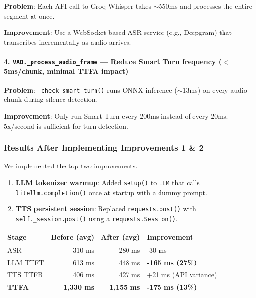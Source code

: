 \textbf{Problem}: Each API call to Groq Whisper takes $\sim$550ms and processes the entire segment at once.

\textbf{Improvement}: Use a WebSocket-based ASR service (e.g., Deepgram) that transcribes incrementally as audio arrives.

\paragraph{4. \texttt{VAD.\_process\_audio\_frame} --- Reduce Smart Turn frequency ($<$5ms/chunk, minimal TTFA impact)}

\textbf{Problem}: \texttt{\_check\_smart\_turn()} runs ONNX inference ($\sim$13ms) on every audio chunk during silence detection.

\textbf{Improvement}: Only run Smart Turn every 200ms instead of every 20ms. 5x/second is sufficient for turn detection.

\subsubsection{Results After Implementing Improvements 1 \& 2}

We implemented the top two improvements:

\begin{enumerate}
    \item \textbf{LLM tokenizer warmup}: Added \texttt{setup()} to \texttt{LLM} that calls \texttt{litellm.completion()} once at startup with a dummy prompt.
    \item \textbf{TTS persistent session}: Replaced \texttt{requests.post()} with \texttt{self.\_session.post()} using a \texttt{requests.Session()}.
\end{enumerate}

\begin{table}[h]
\centering
\begin{tabular}{|l|r|r|l|}
\hline
\textbf{Stage} & \textbf{Before (avg)} & \textbf{After (avg)} & \textbf{Improvement} \\
\hline
ASR & 310 ms & 280 ms & -30 ms \\
LLM TTFT & 613 ms & 448 ms & \textbf{-165 ms (27\%)} \\
TTS TTFB & 406 ms & 427 ms & +21 ms (API variance) \\
\textbf{TTFA} & \textbf{1,330 ms} & \textbf{1,155 ms} & \textbf{-175 ms (13\%)} \\
\hline
\end{tabular}
\end{table}


